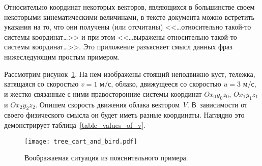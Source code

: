 \label{app_relative_relativity}
Относительно координат некоторых векторов, являющихся в большинстве своем некоторыми кинематическими величинами, в тексте документа можно встретить указания на то, что они получены (или отсчитаны) <<\dots относитель\-но такой-то системы координат\dots>> и при этом <<\dots выражены относительно такой-то системы координат\dots>>.
Это приложение разъясняет смысл данных фраз нижеследующим простым примером.

Рассмотрим рисунок~\ref{img:tree_cart_and_bird}.
На нем изображены стоящий неподвижно куст, тележка, катящаяся со скоростью $v=1\text{ м/с}$, облако, движущееся со скоростью $u=3\text{ м/с}$, и жестко связанные с ними правосторонние системы координат $Ox_0y_0z_0$, $Ox_1y_1z_1$ и $Ox_2y_2z_2$.
Опишем скорость движения облака вектором~$V$.
В~зависимости от своего физического смысла он будет иметь разные координаты.
Наглядно это демонстрирует таблица~\ref{table_values_of_v}.

\begin{figure}[h!]
	\centering
	\texttt{[image: tree\_cart\_and\_bird.pdf]}
	\caption{Воображаемая ситуация из пояснительного примера.}
	\label{img:tree_cart_and_bird}
\end{figure}

